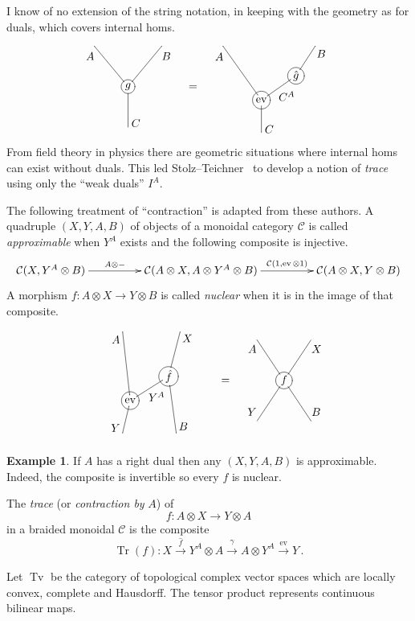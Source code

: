\documentclass[a4paper,12pt]{article}
\theoremstyle{definition}
\newtheorem*{Example}{Example}%
\theoremstyle{fact}
\theoremstyle{genquest}
\theoremstyle{step}
\newcommand{\catC}{\mathcal{C}}
\newcommand{\Tr}{\operatorname{Tr}}
\newcommand{\Tv}{\operatorname{Tv}}
\newcommand{\ev}{\operatorname{ev}}
\newcommand{\longto}{\longrightarrow}
\begin{document}
\goodbreak
\medskip\noindent
I know of no extension of the string notation, in keeping with the geometry as for duals, which covers internal homs.

\goodbreak
\[
\xygraph{ !{/r2.5pc/: /u3pc/::}
 [d] *+[Fo][o]{g} (
  ? - [ul]^(.9)*{A} , ? - [ur]_(.9)*{B} , ? - [d]^(.9)*{C}
 )} \quad = \quad  
 \xygraph{ !{/r2.85pc/: /u2pc/::}
 [d(1.5)] *+[Fo][o]{\ev} (
  ? - [uul]^(.9)*{A} 
  , ? - [ur(.9)]*+[Fo][o]{\hat{g}} _*{C^A}
     - [r(.5)u(1.1)]_(.9)*{B}
  , ? - [d(1.2)]^(.9)*{C}
 )} 
\]
%
From field theory in physics there are geometric situations where internal homs can exist without duals.   
This led Stolz--Teichner~\cite{StolzTeichner} to develop a notion of \emph{trace} using only the ``weak duals'' $I^A$.

The following treatment of ``contraction'' is adapted from these authors. 
A quadruple $(X,Y,A,B)$ of objects of a monoidal category $\catC$ is called \emph{approximable} when $Y^A$ exists and the following composite is injective.
\[
\xymatrix @C+8mm {
\catC (X,Y^A \otimes B) \ar[r]^-{A \otimes -} %
& \catC (A \otimes X, A \otimes Y^A \otimes B)  \ar[r]^-{\catC(1,\ev \otimes 1)} %
& \catC (A \otimes X, Y \otimes B)
}\]
A morphism $f : A \otimes X \longto Y \otimes B$ is called \emph{nuclear} when it is in the image of that composite.


\[
\xygraph{ !{/r2.85pc/: /u3pc/::}
 [d(1.5)] *+[Fo][o]{\ev} (
 ? - [l(.2)u(1.7)]^(.9)*{A} , ? - [l(.2)d(.8)]_(.9)*{Y} , 
 -  [u(.6)r] *+[Fo][o]{\hat{f}}_*{Y^A} (
  ? - [r(.2)d(1.4)]^(.9)*{B}, ? - [r(.3)u(1.1)]_(.9)*{X}
 ))} \quad = \quad  
 \xygraph{ !{/r2pc/: /u3pc/::}
 [d(1)] *+[Fo][o]{f} (
 ? - [ul]^(.9)*{A} , ? - [ur]_(.9)*{X} , ? - [dl]_(.9)*{Y} , ? - [dr]^(.9)*{B}
  )} 
\]

\begin{Example}
If $A$ has a right dual then any $(X,Y,A,B)$ is approximable. 
Indeed, the composite is invertible so every $f$ is nuclear.
\end{Example}

\noindent
The \emph{trace} (or \emph{contraction by} $A$) of 
\[
f : A \otimes X \longto Y \otimes A
\]
in a braided monoidal  $\catC$ is the composite
\[
\Tr (f) : X \stackrel{\hat f}{\longto} Y^A \otimes A \stackrel{\gamma}{\longto} A \otimes Y^A \stackrel{\ev}{\longto} Y\,.
\]


Let $\Tv$ be the category of topological complex vector spaces which are locally convex, complete and Hausdorff. The tensor product represents continuous bilinear maps.
\end{document}
